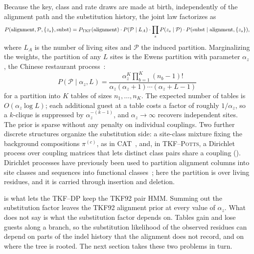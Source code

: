 \documentclass[11pt]{article}
\newcommand{\TKF}{\textsc{TKF}}
\newcommand{\Potts}{\textsc{TKF--Potts}}
\newcommand{\partition}{\mathcal{P}}
\newcommand{\eqm}{\pi}
\begin{document}
Because the key, class and rate draws are made at birth, independently of
the alignment path and the substitution history, the joint law factorizes as
\begin{equation}
\label{eq:factorisation}
P(\text{alignment},\partition,\{z_s\},\text{subst})
 = P_{\TKF}(\text{alignment})\cdot P(\partition\mid L_A)\cdot
   \prod_s P(z_s\mid\partition)\cdot
   P(\text{subst}\mid\text{alignment},\{z_s\}),
\end{equation}
where $L_A$ is the number of living sites and $\partition$ the induced
partition. Marginalizing the weights, the partition of any $L$ sites is the
Ewens partition with parameter $\alpha_z$, the Chinese restaurant
process~\citep{ewens1972,aldous1985}:
\begin{equation}
\label{eq:crp-prior}
P(\partition\mid\alpha_z,L) =
\frac{\alpha_z^{K}\prod_{b=1}^{K}(n_b-1)!}{\alpha_z(\alpha_z+1)\cdots(\alpha_z+L-1)}
\end{equation}
for a partition into $K$ tables of sizes $n_1,\dots,n_K$. The expected number
of tables is $O(\alpha_z\log L)$; each additional guest at a table costs a
factor of roughly $1/\alpha_z$, so a $k$-clique is suppressed by
$\alpha_z^{-(k-1)}$, and $\alpha_z\to\infty$ recovers independent sites. The
prior is sparse without any penalty on individual couplings. Two further
discrete structures organize the substitution side: a site-class mixture
fixing the background compositions $\eqm^{(c)}$, as in
CAT~\citep{Lartillot2004}, and, in \Potts, a Dirichlet process over coupling
matrices that lets distinct class pairs share a coupling
(). Dirichlet processes have previously been used to
partition alignment columns into site classes and sequences into functional
classes~\citep{huelsenbeck2006,huelsenbeck2007,brown2008,nguyen2013,rodrigue2021};
here the partition is over living residues, and it is carried through
insertion and deletion.

 is what lets the TKF--DP keep the TKF92 pair HMM.
Summing out the substitution factor leaves the TKF92 alignment prior at every
value of $\alpha_z$. What  does not say is what the
substitution factor depends on. Tables gain and lose guests along a branch,
so the substitution likelihood of the observed residues can depend on parts
of the indel history that the alignment does not record, and on where the tree
is rooted. The next section takes these two problems in turn.

\end{document}
